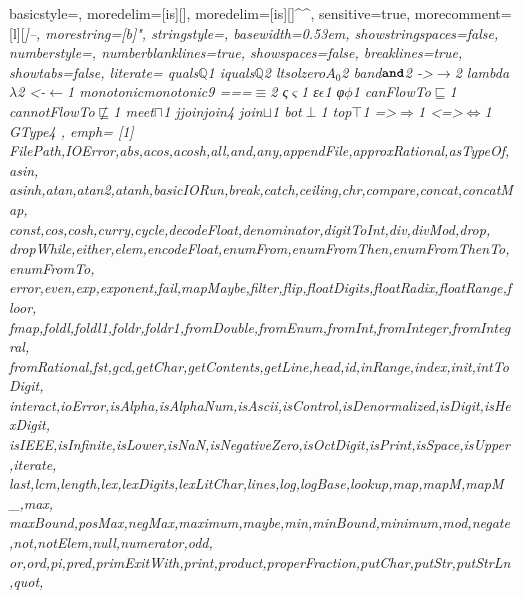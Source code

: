  {
	basicstyle=\ttfamily\small,
	moredelim=[is][\showyesod]{\*}{\*},
	moredelim=[is][\showlio]{\^}{\^},
	sensitive=true,
	morecomment=[l][\color{gray_ulisses}\ttfamily\itshape\codesize]{--},
	morestring=[b]",
	stringstyle=\color{haskellstr},
	basewidth={0.53em},
	showstringspaces=false,
	numberstyle=\codesize,
	numberblanklines=true,
	showspaces=false,
	breaklines=true,
	showtabs=false,
  literate={ {quals}{{$\mathbb{Q}$}}1
             {iquals}{{$\mathbb{Q}$}}2
             {ltsolzero}{{$A_0$}}2
             {band}{{$\textbf{\texttt{and}}$}}2
             {->}{{$\rightarrow$}}2
             {lambda}{{$\lambda$}}2
             {<-}{{$\leftarrow$}}1
             {monotonic}{{monotonic}}9
             {===}{{$\equiv$}}2
             {ς}{{$\varsigma$}}1
             {ε}{{$\epsilon$}}1
             {φ}{{$\phi$}}1
             {canFlowTo}{{$\sqsubseteq$}}1
             {cannotFlowTo}{{$\not\sqsubseteq$}}1
             {meet}{{$\sqcap$}}1
             {jjoin}{{join}}4
             {join}{{$\sqcup$}}1
             {bot}{{$\perp$}}1
             {top}{{$\top$}}1
             {=>}{{$\Rightarrow$}}1
             {<=>}{{$\Leftrightarrow$}}1
             {GType}{{}}4
           },
	emph=
	{[1]
		FilePath,IOError,abs,acos,acosh,all,and,any,appendFile,approxRational,asTypeOf,asin,
		asinh,atan,atan2,atanh,basicIORun,break,catch,ceiling,chr,compare,concat,concatMap,
		const,cos,cosh,curry,cycle,decodeFloat,denominator,digitToInt,div,divMod,drop,
		dropWhile,either,elem,encodeFloat,enumFrom,enumFromThen,enumFromThenTo,enumFromTo,
		error,even,exp,exponent,fail,mapMaybe,filter,flip,floatDigits,floatRadix,floatRange,floor,
		fmap,foldl,foldl1,foldr,foldr1,fromDouble,fromEnum,fromInt,fromInteger,fromIntegral,
		fromRational,fst,gcd,getChar,getContents,getLine,head,id,inRange,index,init,intToDigit,
		interact,ioError,isAlpha,isAlphaNum,isAscii,isControl,isDenormalized,isDigit,isHexDigit,
		isIEEE,isInfinite,isLower,isNaN,isNegativeZero,isOctDigit,isPrint,isSpace,isUpper,iterate,
		last,lcm,length,lex,lexDigits,lexLitChar,lines,log,logBase,lookup,map,mapM,mapM_,max,
		maxBound,posMax,negMax,maximum,maybe,min,minBound,minimum,mod,negate,not,notElem,null,numerator,odd,
		or,ord,pi,pred,primExitWith,print,product,properFraction,putChar,putStr,putStrLn,quot,
}}
